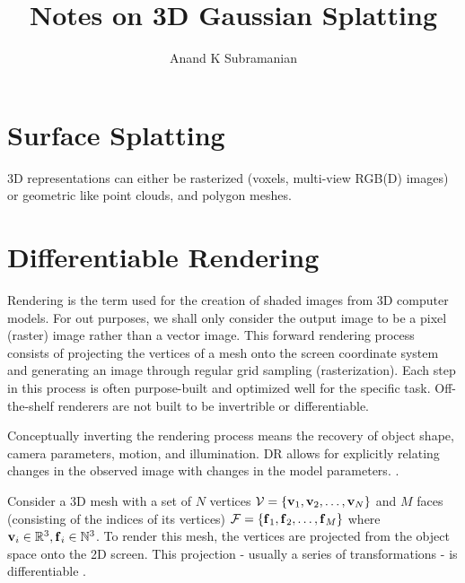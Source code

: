 


\title{Notes on 3D Gaussian Splatting}
\author{Anand K Subramanian}
\date{}



\maketitle


\section{Surface Splatting}

3D representations can either be rasterized (voxels, multi-view RGB(D) images) or geometric like point clouds, and polygon meshes.

\section{Differentiable Rendering}
Rendering is the term used for the creation of shaded images from 3D computer models. For out purposes, we shall only consider the output image to be a pixel (raster) image rather than a vector image. This forward rendering process consists of projecting the vertices of a mesh onto the screen coordinate system and generating an image through regular grid sampling (rasterization). Each step in this process is often purpose-built and optimized well for the specific task. Off-the-shelf renderers are not built to be invertrible or differentiable.

Conceptually inverting the rendering process means the recovery of object shape, camera parameters, motion, and illumination. DR allows for explicitly relating changes in the observed image with changes in the model parameters. \cite{loper2014opendr}.



Consider a 3D mesh with a set of $N$ vertices $\mathcal{V} = \{\mbox{$\mbox{$\mathbf{v}$}$}_1, \mbox{$\mbox{$\mathbf{v}$}$}_2, \ldots, \mbox{$\mbox{$\mathbf{v}$}$}_N\}$ and $M$ faces (consisting of the indices of its vertices) $\mathcal{F} = \{\mbox{$\mbox{$\mathbf{f}$}$}_1, \mbox{$\mbox{$\mathbf{f}$}$}_2, \ldots, \mbox{$\mbox{$\mathbf{f}$}$}_M\}$ where $\mbox{$\mbox{$\mathbf{v}$}$}_i \in \mathbb{R}^3, \mbox{$\mbox{$\mathbf{f}$}$}_i \in \mathbb{N}^3$. To render this mesh, the vertices are projected from the object space onto the 2D screen. This projection - usually a series of transformations - is differentiable \cite{shirley2009fundamentals}.


